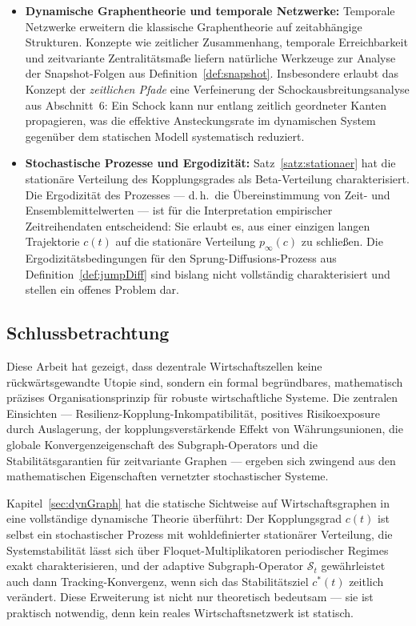\documentclass[a4paper, 12pt, twoside, openright]{report}
\theoremstyle{definition}
\theoremstyle{definition}
\begin{document}
\begin{itemize}
    \item \textbf{Dynamische Graphentheorie und temporale Netzwerke:}
          Temporale Netzwerke \citep{holme2012temporal} erweitern die klassische
          Graphentheorie auf zeitabhängige Strukturen. Konzepte wie zeitlicher
          Zusammenhang, temporale Erreichbarkeit und zeitvariante Zentralitätsmaße
          liefern natürliche Werkzeuge zur Analyse der Snapshot-Folgen aus
          Definition~\ref{def:snapshot}. Insbesondere erlaubt das Konzept der
          \emph{zeitlichen Pfade} eine Verfeinerung der Schockausbreitungsanalyse
          aus Abschnitt~6: Ein Schock kann nur entlang zeitlich geordneter Kanten
          propagieren, was die effektive Ansteckungsrate im dynamischen System
          gegenüber dem statischen Modell systematisch reduziert.

    \item \textbf{Stochastische Prozesse und Ergodizität:}
          Satz~\ref{satz:stationaer} hat die stationäre Verteilung des
          Kopplungsgrades als Beta-Verteilung charakterisiert. Die Ergodizität
          des Prozesses --- d.\,h.\ die Übereinstimmung von Zeit- und
          Ensemblemittelwerten --- ist für die Interpretation empirischer
          Zeitreihendaten entscheidend: Sie erlaubt es, aus einer einzigen
          langen Trajektorie $c(t)$ auf die stationäre Verteilung $p_\infty(c)$
          zu schließen. Die Ergodizitätsbedingungen für den Sprung-Diffusions-Prozess
          aus Definition~\ref{def:jumpDiff} sind bislang nicht vollständig
          charakterisiert und stellen ein offenes Problem dar.
\end{itemize}

\subsection{Schlussbetrachtung}

Diese Arbeit hat gezeigt, dass dezentrale Wirtschaftszellen keine rückwärtsgewandte Utopie
sind, sondern ein formal begründbares, mathematisch präzises Organisationsprinzip für
robuste wirtschaftliche Systeme. Die zentralen Einsichten --- Resilienz-Kopplung-Inkompatibilität,
positives Risikoexposure durch Auslagerung, der kopplungsverstärkende Effekt von
Währungsunionen, die globale Konvergenzeigenschaft des Subgraph-Operators und die
Stabilitätsgarantien für zeitvariante Graphen --- ergeben sich zwingend aus den
mathematischen Eigenschaften vernetzter stochastischer Systeme.

Kapitel~\ref{sec:dynGraph} hat die statische Sichtweise auf Wirtschaftsgraphen in eine
vollständige dynamische Theorie überführt: Der Kopplungsgrad $c(t)$ ist selbst ein
stochastischer Prozess mit wohldefinierter stationärer Verteilung, die Systemstabilität
lässt sich über Floquet-Multiplikatoren periodischer Regimes exakt charakterisieren,
und der adaptive Subgraph-Operator $\mathcal{S}_t$ gewährleistet auch dann Tracking-Konvergenz,
wenn sich das Stabilitätsziel $c^*(t)$ zeitlich verändert. Diese Erweiterung ist nicht nur
theoretisch bedeutsam --- sie ist praktisch notwendig, denn kein reales Wirtschaftsnetzwerk
ist statisch.
\end{document}
